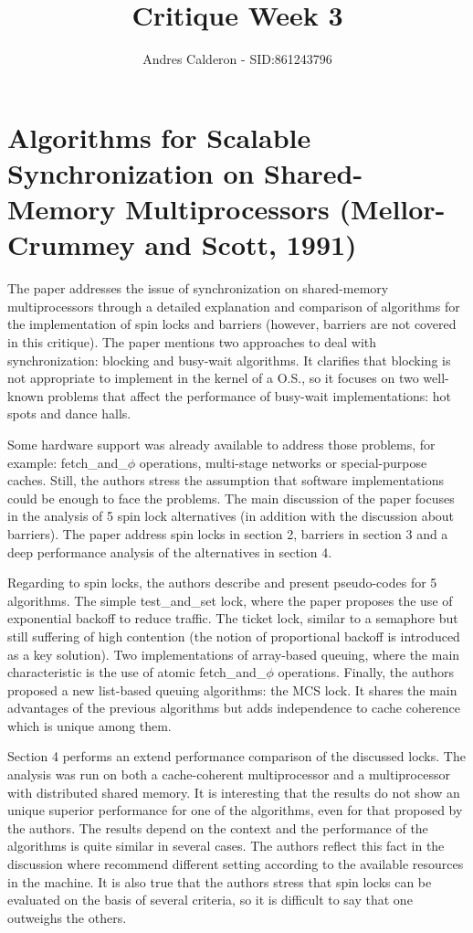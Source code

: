 \documentclass[a4paper,10pt]{scrartcl}
\title{Critique Week 3}
\author{Andres Calderon - SID:861243796}
\begin{document}
\maketitle
\thispagestyle{empty}

\section*{Algorithms for Scalable Synchronization on Shared-Memory Multiprocessors (Mellor-Crummey and Scott, 1991)}
The paper addresses the issue of synchronization on shared-memory multiprocessors through a detailed explanation and comparison of algorithms for the implementation of spin locks and barriers (however, barriers are not covered in this critique).   The paper mentions two approaches to deal with synchronization: blocking and busy-wait algorithms.  It clarifies that blocking is not appropriate to implement in the kernel of a O.S., so it focuses on two well-known problems that affect the performance of busy-wait implementations: hot spots and dance halls. 

Some hardware support was already available to address those problems, for example: fetch\_and\_$\phi$ operations, multi-stage networks or special-purpose caches. Still, the authors stress the assumption that software implementations could be enough to face the problems.  The main discussion of the paper focuses in the analysis of 5 spin lock alternatives (in addition with the discussion about barriers).  The paper address spin locks in section 2, barriers in section 3 and a deep performance analysis of the alternatives in section 4.

Regarding to spin locks, the authors describe and present pseudo-codes for 5 algorithms.  The simple test\_and\_set lock, where the paper proposes the use of exponential backoff to reduce traffic. The ticket lock, similar to a semaphore but still suffering of high contention (the notion of proportional backoff is introduced as a key solution).  Two implementations of array-based queuing, where the main characteristic is the use of atomic fetch\_and\_$\phi$ operations.  Finally, the authors proposed a new list-based queuing algorithms: the MCS lock.  It shares the main advantages of the previous algorithms but adds independence to cache coherence which is unique among them.

Section 4 performs an extend performance comparison of the discussed locks.  The analysis was run on both a cache-coherent multiprocessor and a multiprocessor with distributed shared memory. It is interesting that the results do not show an unique superior performance for one of the algorithms, even for that proposed by the authors.  The results depend on the context and the performance of the algorithms is quite similar in several cases.  The authors reflect this fact in the discussion where recommend different setting according to the available resources in the machine.  It is also true that the authors stress that spin locks can be evaluated on the basis of several criteria, so it is difficult to say that one outweighs the others. 
\end{document}
